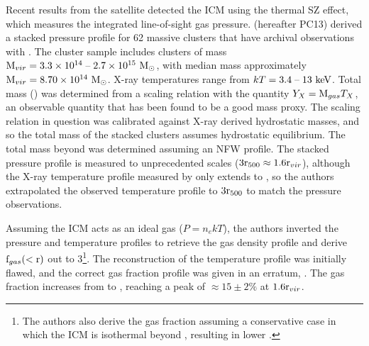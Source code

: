 Recent results from the \Planck{} satellite detected the ICM using the
thermal SZ effect, which measures the integrated line-of-sight gas
pressure. \textbf{\citet{PlanckIntV}} (hereafter PC13) derived a
stacked pressure profile for 62 massive clusters that have archival
observations with \XMM. The cluster sample \citep[detailed
  in][]{PlanckEarlyXI} includes clusters of mass $\textrm{M\ensuremath{_{vir}}} =
3.3\times 10^{14}\;\textrm{--}\;2.7 \times 10^{15}~\textrm{M}_\odot$, with median mass
approximately $\textrm{M\ensuremath{_{vir}}} = 8.70 \times 10^{14}~\textrm{M}_\odot$. X-ray temperatures
range from $kT = 3.4\;\textrm{--}\;13~\textrm{keV}$. Total mass (\Mfive) was determined
from a scaling relation with the quantity $Y_X = \textrm{M}_{gas}T_X$, an
observable quantity that has been found to be a good mass proxy. The
scaling relation in question \citep{Arnaud2010} was calibrated against
X-ray derived hydrostatic masses, and so the total mass of the stacked
\Planck{} clusters assumes hydrostatic equilibrium. The total mass
beyond \rfive{} was determined assuming an NFW profile. The stacked
pressure profile is measured to unprecedented scales ($3\textrm{r\ensuremath{_{500}}} \approx
1.6\textrm{r\ensuremath{_{vir}}}$), although the X-ray temperature profile measured by \XMM{}
only extends to \rfive{}, so the authors extrapolated the observed
temperature profile to $3\textrm{r\ensuremath{_{500}}}{}$ to match the pressure observations.

Assuming the ICM acts as an ideal gas ($P=n_ekT$), the authors
inverted the pressure and temperature profiles to retrieve the gas
density profile and derive $\textrm{f\ensuremath{_{gas}}}{}(<\textrm{r})$ out to
3\rfive{}\footnote{The authors also derive the gas fraction assuming a
  conservative case in which the ICM is isothermal beyond \rfive{},
  resulting in lower \fg{}.}. The reconstruction of the temperature
profile was initially flawed, and the correct gas fraction profile was
given in an erratum, \citet{PlanckIntVb}. The gas fraction increases
from \rfive{} to \rvir{} \citep[as indeed shown by][see
  \ref{sec:Gas.Extrapolation}]{Rasheed2011}, reaching a peak of
$\approx 15\pm2\%$ at $1.6\textrm{r\ensuremath{_{vir}}}{}$.

